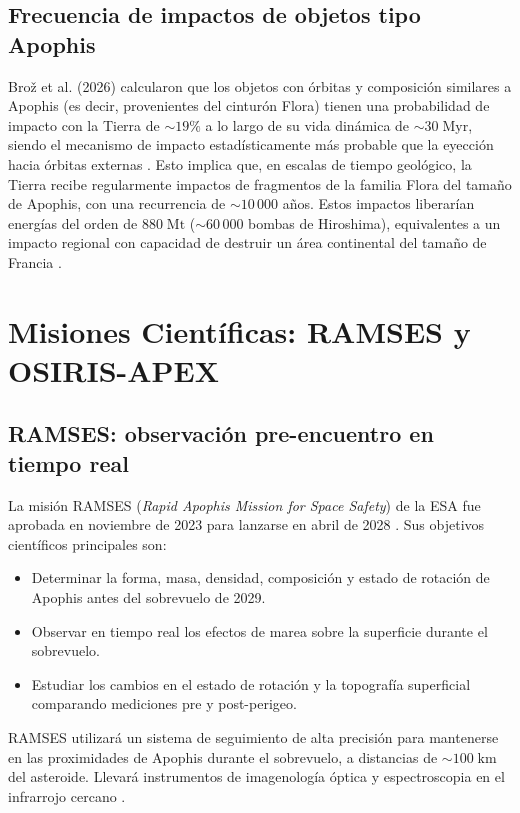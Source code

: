 \documentclass[a4paper]{article}
\begin{document}
\subsection{Frecuencia de impactos de objetos tipo Apophis}

Brož et al. (2026) calcularon que los objetos con órbitas y composición similares a Apophis (es decir, provenientes del cinturón Flora) tienen una probabilidad de impacto con la Tierra de $\sim 19\%$ a lo largo de su vida dinámica de $\sim 30\;\text{Myr}$, siendo el mecanismo de impacto estadísticamente más probable que la eyección hacia órbitas externas \cite{broz2026apophis}. Esto implica que, en escalas de tiempo geológico, la Tierra recibe regularmente impactos de fragmentos de la familia Flora del tamaño de Apophis, con una recurrencia de $\sim 10\,000$ años. Estos impactos liberarían energías del orden de $880\;\text{Mt}$ ($\sim 60\,000$ bombas de Hiroshima), equivalentes a un impacto regional con capacidad de destruir un área continental del tamaño de Francia \cite{nasa2025apophisfacts, broz2026apophis}.

\section{Misiones Científicas: RAMSES y OSIRIS-APEX}

\subsection{RAMSES: observación pre-encuentro en tiempo real}

La misión RAMSES (\textit{Rapid Apophis Mission for Space Safety}) de la ESA fue aprobada en noviembre de 2023 para lanzarse en abril de 2028 \cite{esa2024ramses}. Sus objetivos científicos principales son:
\begin{itemize}
  \item Determinar la forma, masa, densidad, composición y estado de rotación de Apophis antes del sobrevuelo de 2029.
  \item Observar en tiempo real los efectos de marea sobre la superficie durante el sobrevuelo.
  \item Estudiar los cambios en el estado de rotación y la topografía superficial comparando mediciones pre y post-perigeo.
\end{itemize}

RAMSES utilizará un sistema de seguimiento de alta precisión para mantenerse en las proximidades de Apophis durante el sobrevuelo, a distancias de $\sim 100\;\text{km}$ del asteroide. Llevará instrumentos de imagenología óptica y espectroscopia en el infrarrojo cercano \cite{esa2024ramses}.
\end{document}
